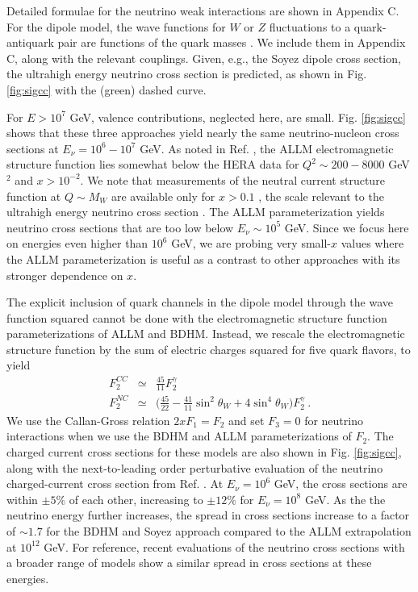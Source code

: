 \documentclass[aps,10pt,twocolumn,tightenlines]{revtex4-1}
\begin{document}
Detailed formulae for the neutrino weak interactions are shown in Appendix C. For the dipole model, the
wave functions for $W$ or $Z$ fluctuations to a quark-antiquark pair are functions of the quark masses 
\cite{Fiore:2011gx,Barone:1993es,Kutak:2003bd,Arguelles:2015wba}. We include them in Appendix C, along with the relevant couplings.
 Given, e.g., the Soyez dipole cross section,
the ultrahigh energy neutrino cross section is predicted, as shown in Fig. \ref{fig:sigcc} with the (green) dashed curve.  

For $E>10^7$ GeV,
valence contributions, neglected here, are small.  Fig. \ref{fig:sigcc}
 shows that these three approaches yield nearly the same
neutrino-nucleon cross sections at $E_\nu=10^6-10^7$ GeV. As noted in Ref. \cite{Armesto:2007tg}, the ALLM electromagnetic structure function lies somewhat below the HERA data for $Q^2\sim 200-8000$ GeV$^2$ and $x >10^{-2}$. We note that measurements of the neutral current structure function at $Q\sim M_W$ are available only for $x>0.1$ 
\cite{Aaron:2009aa}, the scale relevant to the ultrahigh energy neutrino cross section \cite{Gandhi:1998ri}. 
The ALLM parameterization yields neutrino cross sections that are too low below $E_\nu\sim 10^5$ GeV. Since we focus here on energies even higher than $10^6$ GeV, we are probing very small-$x$ values where the ALLM parameterization is useful as a contrast to other approaches with its stronger dependence on $x$. 

The explicit inclusion of quark channels in the dipole model through the wave function squared cannot be done with the electromagnetic structure function 
parameterizations of ALLM and BDHM. Instead, we rescale the electromagnetic structure function
by the sum of electric charges squared for five quark flavors, to yield
\begin{eqnarray}
F_2^{CC}&\simeq& \frac{45}{11} F_2^{\gamma} \\
F_2^{NC}&\simeq&\biggl(  \frac{45}{22}-\frac{41}{11}\sin^2\theta_W+4\sin^4\theta_W\biggr)
 F_2^{\gamma} \ .
\end{eqnarray}
We use the Callan-Gross relation $2xF_1=F_2$ and set $F_3=0$ for neutrino interactions when we use the
BDHM and ALLM parameterizations of $F_2$. The charged current cross sections for these models are also
shown in Fig. \ref{fig:sigcc}, along with the next-to-leading order perturbative evaluation of the neutrino charged-current
cross section from Ref. \cite{Jeong:2010za}. At $E_\nu=10^6$ GeV, the cross sections are within $\pm 5\%$ of each other,
increasing to $\pm 12\%$ for $E_\nu=10^8$ GeV. As the the neutrino energy further increases, the spread in cross sections increase to a factor of $\sim 1.7$ for the BDHM and Soyez approach compared to the ALLM extrapolation at $10^{12}$ GeV. For reference, recent evaluations of the neutrino cross sections with a broader range of models \cite{CooperSarkar:2011pa,Fiore:2011gx,Goncalves:2015fua,Albacete:2015zra} show a similar spread in cross sections at these energies.
\end{document}
